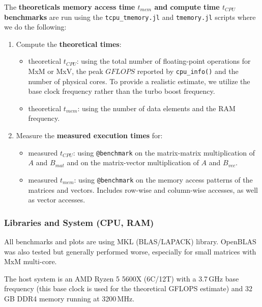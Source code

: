 The \textbf{theoreticals memory access time $t_{mem}$ and compute time $t_{CPU}$ benchmarks} are run using the \texttt{tcpu\_tmemory.jl} and \texttt{tmemory.jl} scripts where we do the following:
\begin{enumerate}
    \item Compute the \textbf{theoretical times}:
    \begin{itemize}
        \item theoretical $t_{CPU}$: using the total number of floating-point operations for MxM or MxV, the peak $GFLOPS$ reported by \texttt{cpu\_info()} and the number of physical cores. To provide a realistic estimate, we utilize the base clock frequency rather than the turbo boost frequency.
        \item theoretical $t_{mem}$: using the number of data elements and the RAM frequency.
    \end{itemize}
    \item Measure the \textbf{measured execution times} for:
    \begin{itemize} %
        \item measured $t_{CPU}$: using \texttt{@benchmark} on the matrix-matrix multiplication of $A$ and $B_{mat}$ and on the matrix-vector multiplication of $A$ and $B_{vec}$.
        \item measured $t_{mem}$: using \texttt{@benchmark} on the memory access patterns of the matrices and vectors. Includes row-wise and column-wise accesses, as well as vector accesses.
    \end{itemize}
\end{enumerate}

\vspace{1em}

\subsubsection*{Libraries and System (CPU, RAM)}

All benchmarks and plots are using MKL \cite{MKL} (BLAS/LAPACK) library. OpenBLAS was also tested but generally performed worse, especially for small matrices with MxM multi-core. 

The host system is an AMD Ryzen 5 5600X \cite{Ryzen5600Xspecs} (6C/12T) with a 3.7\,GHz base frequency (this base clock is used for the theoretical GFLOPS estimate) and 32\,GB DDR4 memory running at 3200\,MHz.


\clearpage

